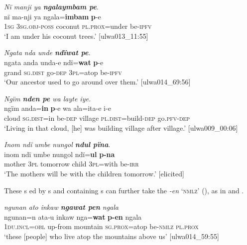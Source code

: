 \ea%
    \label{ex:otherwc:24}
          \textit{Nï manji ya \textbf{ngalaymbam pe}}.\\
\gll nï    ma-nji      ya      ngala=\textbf{imbam}    \textbf{p}{}-e\\
    1\textsc{sg}  3\textsc{sg.obj-poss}  coconut  \textsc{pl.prox}=under  be\textsc{{}-ipfv}\\
\glt `I am under his coconut trees.’ [ulwa013\_11:55]
\z


\ea%
    \label{ex:otherwc:25}
          \textit{Ngata nda unde \textbf{ndïwat pe}}.\\
\gll ngata  anda    unda-e  ndï=\textbf{wat}  \textbf{p}{}-e\\
    grand  \textsc{sg.dist}  go-\textsc{dep}  \textsc{3pl}=atop  be\textsc{{}-ipfv}\\
\glt `Our ancestor used to go around over them.’ [ulwa014\_69:56]
\z

\ea%
    \label{ex:otherwc:26}
          \textit{Ngïm \textbf{nden pe} wa layte iye.}\\
\gll    ngïm  anda=\textbf{in}  \textbf{p}{}-e    wa    ala=ita-e        i-e\\
    cloud  \textsc{sg.dist=}in  be\textsc{{}-dep} village  \textsc{pl.dist}=build-\textsc{dep}  go.\textsc{pfv-dep}\\
\glt `Living in that cloud, [he] was building village after village.’ [ulwa009\_00:06]
\z

\ea%
    \label{ex:otherwc:27}
          \textit{Inom ndï umbe nungol \textbf{ndul pïna}}.\\
\gll inom  ndï  umbe    nungol  ndï=\textbf{ul}    \textbf{p-na}\\
    mother  3\textsc{pl}  tomorrow  child  3\textsc{pl}=with  be-\textsc{irr}\\
\glt `The mothers will be with the children tomorrow.’ [elicited]
\z

These s ed by s and containing s can further take the   \textit{-en} ‘\textsc{nmlz}’ (), as in  and .

\ea%
    \label{ex:otherwc:28}
          \textit{ngunan ato inkaw \textbf{ngawat pen} ngala}\\
\gll    ngunan=n      ata-u    inkaw    nga=\textbf{wat}    \textbf{p-en} ngala\\
    1\textsc{du.incl=obl}  up-from  mountain  \textsc{sg.prox}=atop  be\textsc{{}-nmlz}    \textsc{pl.prox}\\
\glt `these [people] who live atop the mountains above us’ [ulwa014\_59:55]
\z

